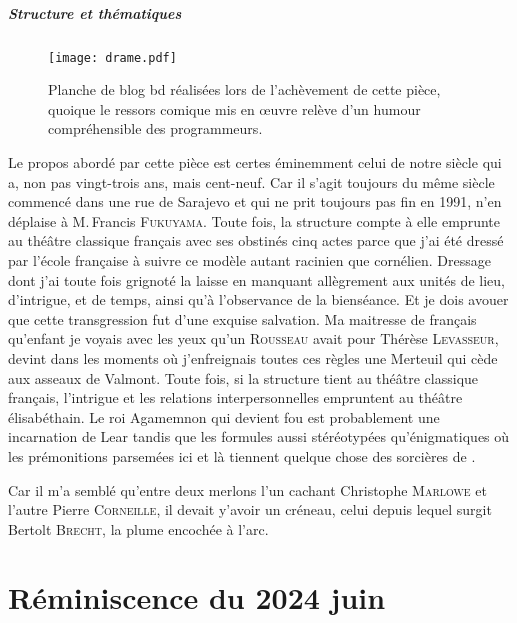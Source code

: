\paragraph{Structure et thématiques}
\begin{figure}[!t]
	\centering
	\texttt{[image: drame.pdf]}
	\caption{Planche de blog bd réalisées lors de l’achèvement de cette pièce, quoique le ressors comique mis en œuvre relève d’un humour compréhensible des programmeurs.}
\end{figure}
Le  propos abordé par cette pièce est certes éminemment celui de notre siècle qui a, non pas vingt-trois ans, mais cent-neuf. Car il s’agit toujours du même siècle commencé dans une rue de Sarajevo et qui ne prit toujours pas fin en 1991, n’en déplaise à M.\,Francis \textsc{Fukuyama}. Toute fois, la structure compte à elle emprunte au théâtre classique français avec ses obstinés cinq actes parce que j’ai été dressé par l’école française à suivre ce modèle autant racinien que cornélien. Dressage dont j’ai toute fois grignoté la laisse en manquant allègrement aux unités de lieu, d’intrigue, et de temps, ainsi qu’à l’observance de la bienséance. Et je dois avouer que cette transgression fut d’une exquise salvation. Ma maitresse de français qu’enfant je voyais avec les yeux qu’un \textsc{Rousseau} avait pour Thérèse \textsc{Levasseur}, devint dans les moments où j’enfreignais toutes ces règles une Merteuil qui cède aux asseaux de Valmont. Toute fois, si la structure tient au théâtre classique français, l’intrigue et les relations interpersonnelles empruntent au théâtre élisabéthain. Le roi Agamemnon qui devient fou est probablement une incarnation de Lear tandis que les formules aussi stéréotypées qu’énigmatiques où les prémonitions parsemées ici et là tiennent quelque chose des sorcières de .

Car il m’a semblé qu’entre deux merlons l’un cachant Christophe \textsc{Marlowe} et l’autre Pierre \textsc{Corneille}, il devait y’avoir un créneau, celui depuis lequel surgit Bertolt \textsc{Brecht}, la plume encochée à l’arc.


\chapter{Réminiscence du 2024 juin}

